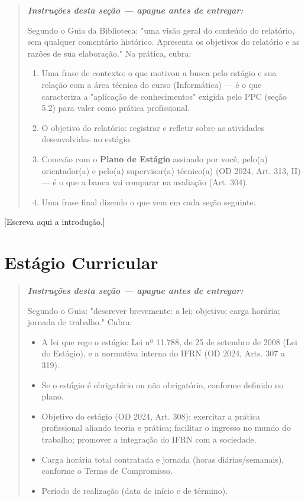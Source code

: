 \documentclass[article,12pt,a4paper,oneside]{abntex2}
\newenvironment{instrucoes}{%
  \begin{quotation}\footnotesize\itshape
  \noindent\textbf{\upshape Instruções desta seção — apague antes de entregar:}\par\smallskip
}{%
  \end{quotation}
}
\begin{document}
\begin{instrucoes}
Segundo o Guia da Biblioteca: "uma visão geral do conteúdo do relatório, sem qualquer comentário histórico. Apresenta os objetivos do relatório e as razões de sua elaboração." Na prática, cubra:
\begin{enumerate}
  \item Uma frase de contexto: o que motivou a busca pelo estágio e sua relação com a área técnica do curso (Informática) — é o que caracteriza a "aplicação de conhecimentos" exigida pelo PPC (seção 5.2) para valer como prática profissional.
  \item O objetivo do relatório: registrar e refletir sobre as atividades desenvolvidas no estágio.
  \item Conexão com o \textbf{Plano de Estágio} assinado por você, pelo(a) orientador(a) e pelo(a) supervisor(a) técnico(a) (OD 2024, Art. 313, II) — é o que a banca vai comparar na avaliação (Art. 304).
  \item Uma frase final dizendo o que vem em cada seção seguinte.
\end{enumerate}
\end{instrucoes}

[Escreva aqui a introdução.]

\section{Estágio Curricular}

\begin{instrucoes}
Segundo o Guia: "descrever brevemente: a lei; objetivo; carga horária; jornada de trabalho." Cubra:
\begin{itemize}
  \item A lei que rege o estágio: Lei nº 11.788, de 25 de setembro de 2008 (Lei do Estágio), e a normativa interna do IFRN (OD 2024, Arts. 307 a 319).
  \item Se o estágio é obrigatório ou não obrigatório, conforme definido no plano.
  \item Objetivo do estágio (OD 2024, Art. 308): exercitar a prática profissional aliando teoria e prática; facilitar o ingresso no mundo do trabalho; promover a integração do IFRN com a sociedade.
  \item Carga horária total contratada e jornada (horas diárias/semanais), conforme o Termo de Compromisso.
  \item Período de realização (data de início e de término).
\end{itemize}
\end{instrucoes}
\end{document}
